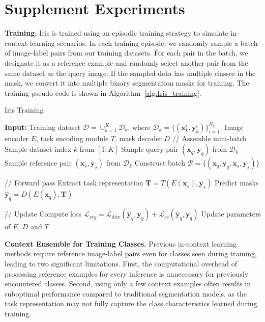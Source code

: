 \section{Supplement Experiments}

\noindent\textbf{Training.}
Iris is trained using an episodic training strategy to simulate in-context learning scenarios. In each training episode, we randomly sample a batch of image-label pairs from our training datasets. For each pair in the batch, we designate it as a reference example and randomly select another pair from the same dataset as the query image. If the sampled data has multiple classes in the mask, we convert it into multiple binary segmentation masks for training.  The training pseudo code is shown in Algorithm~\ref{alg:Iris_training}. 

\begin{algorithm}[h]
\small
\caption{Iris Training}
\label{alg:Iris_training}
\begin{algorithmic}[1]
\State \textbf{Input:} Training dataset $\mathcal{D} = \cup_{k=1}^{K} \mathcal{D}_k$, where $\mathcal{D}_k = \{(\boldsymbol{x}_{k}^i, \boldsymbol{y}_{k}^i)\}_{i=1}^{N_k}$. Image encoder $E$, task encoding module $T$, mask decoder $D$
    \State // Assemble mini-batch
        \State Sample dataset index $k$ from $[1,K]$
        \State Sample query pair $(\boldsymbol{x}_q, \boldsymbol{y}_q)$ from $\mathcal{D}_k$
        \State Sample reference pair $(\boldsymbol{x}_s, \boldsymbol{y}_s)$ from $\mathcal{D}_k$
    \EndFor
    \State Construct batch $\mathcal{B} = \{(\boldsymbol{x}_q, \boldsymbol{y}_q, \boldsymbol{x}_s, \boldsymbol{y}_s)\}$
    
    \State // Forward pass
    \State Extract task representation $\boldsymbol{T} = T(E(\boldsymbol{x}_s), \boldsymbol{y}_s)$
    \State Predict masks $\boldsymbol{\hat{y}}_q = D(E(\boldsymbol{x}_q), \boldsymbol{T})$
    
    \State // Update
    \State Compute loss $\mathcal{L}_{seg} = \mathcal{L}_\text{dice}(\boldsymbol{\hat{y}}_q, \boldsymbol{y}_q) + \mathcal{L}_\text{ce}(\boldsymbol{\hat{y}}_q, \boldsymbol{y}_q)$
    \State Update parameters of $E$, $D$ and $T$
\EndWhile
\end{algorithmic}
\end{algorithm}




\noindent\textbf{Context Ensemble for Training Classes.}
Previous in-context learning methods require reference image-label pairs even for classes seen during training, leading to two significant limitations. First, the computational overhead of processing reference examples for every inference is unnecessary for previously encountered classes. Second, using only a few context examples often results in suboptimal performance compared to traditional segmentation models, as the task representation may not fully capture the class characteristics learned during training.

